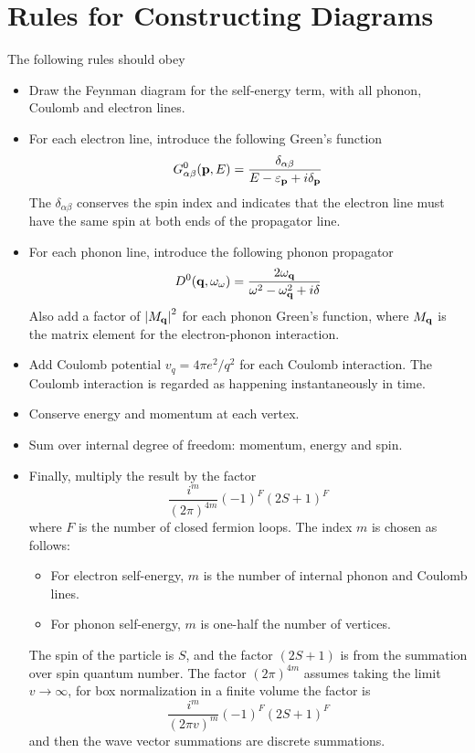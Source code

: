 \section{Rules for Constructing Diagrams}\label{s2.8}
The following rules should obey
\begin{itemize}
  \item Draw the Feynman diagram for the self-energy term, with all phonon, Coulomb and electron lines.
  \item For each electron line, introduce the following Green's function
  \begin{equation}
    G_{\alpha\beta}^0(\mathbf{p},E)=\frac{\delta_{\alpha\beta}}{E-\varepsilon_{\mathbf{p}} + i\delta_{\mathbf{p}}} \label{2.124}
  \end{equation}
  The $\delta_{\alpha\beta}$ conserves the spin index and indicates that the electron line must have the same spin at both ends of the propagator line.
  \item For each phonon line, introduce the following phonon propagator
  \begin{equation}
    \label{2.125}
    D^0(\mathbf{q}, \omega_\omega) = \frac{2\omega_{\mathbf{q}}}{\omega^2-\omega^2_{\mathbf{q}}+i\delta}
  \end{equation}
  Also add a factor of $\abs{M_{\mathbf{q}}}^2$ for each phonon Green's function, where $M_{\mathbf{q}}$ is the matrix element for the electron-phonon interaction.
  \item Add Coulomb potential $v_q=4\pi e^2/q^2$ for each Coulomb interaction. The Coulomb interaction is regarded as happening instantaneously in time.
  \item Conserve energy and momentum at each vertex.
  \item Sum over internal degree of freedom: momentum, energy and spin.
  \item Finally, multiply the result by the factor
  \begin{equation}
    \frac{i^m}{(2\pi)^{4m}} (-1)^F (2S+1)^F   \label{2.126}
  \end{equation}
  where $F$ is the number of closed fermion loops. The index $m$ is chosen as follows:
    \begin{itemize}
      \item For electron self-energy, $m$ is the number of internal phonon and Coulomb lines.
      \item For phonon self-energy, $m$ is one-half the number of vertices.
    \end{itemize}
  The spin of the particle is $S$, and the factor $(2S+1)$ is from the summation over spin quantum number. The factor $(2\pi)^{4m}$ assumes taking the limit $v\to \infty$, for box normalization in a finite volume the factor is
  \begin{equation}
    \label{2.127}
    \frac{i^m}{(2\pi v)^m} (-1)^F(2S+1)^F
  \end{equation}
  and then the wave vector summations are discrete summations.
\end{itemize}

